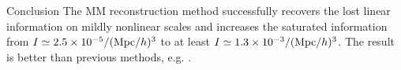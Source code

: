 \begin{section}{Conclusion}
  \label{sec:conclusion}
  The MM reconstruction method successfully recovers the lost linear
  information on mildly nonlinear scales and increases the saturated
  information from $I \simeq 2.5 \times 10^{-5}/({\rm Mpc}/h)^3$
  to at least $I \simeq 1.3 \times 10^{-3}/({\rm Mpc}/h)^3$.  The result is
  better than previous methods,
  e.g. \cite{bib:Mark2006,bib:Mark2009,bib:Zhang2011,bib:Yu2012}.




\end{section}
